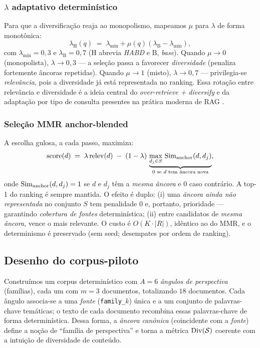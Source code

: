 \subsubsection{$\lambda$ adaptativo determinístico}

Para que a diversificação reaja ao monopolismo, mapeamos $\mu$ para $\lambda$ de
forma monotônica:
\[
\label{eq:lambda}
\lambda_{\mathrm H}(q) \;=\; \lambda_{\min} + \mu(q)
\left(\lambda_{\mathrm B} - \lambda_{\min}\right),
\]
com $\lambda_{\min}=0{,}3$ e $\lambda_{\mathrm B}=0{,}7$
($\mathrm H$ abrevia \emph{HABD} e $\mathrm B$, \emph{base}).
Quando $\mu\to 0$
(monopolista), $\lambda\to 0{,}3$ — a seleção passa a favorecer \emph{diversidade}
(penaliza fortemente âncoras repetidas). Quando $\mu\to 1$ (misto), $\lambda\to
0{,}7$ — privilegia-se \emph{relevância}, pois a diversidade já está
representada no ranking. Essa rotação entre relevância e diversidade é a ideia
central do \emph{over-retrieve + diversify} e da adaptação por tipo de consulta
presentes na prática moderna de RAG \citep{Khan2026DFRAG,RezaeiDieng2025VendiRAG}.

\subsubsection{Seleção MMR anchor-blended}

A escolha gulosa, a cada passo, maximiza:
\[
\label{eq:habdscore}
\mathrm{score}(d) \;=\; \lambda\,\mathrm{relev}(d) \;-\; (1-\lambda)\,
\underbrace{\max_{d_j\in S}\, \Sim_{\mathrm{anchor}}(d,d_j)}_{\mathclap{\text{0 se }d\text{ tem âncora nova}}} ,
\]
onde $\mathrm{Sim}_{\mathrm{anchor}}(d,d_j)=1$ se $d$ e $d_j$ têm a \emph{mesma âncora} e
$0$ caso contrário. A top-1 do ranking é sempre mantida. O efeito é duplo: (i)
uma \emph{âncora ainda não representada} no conjunto $S$ tem penalidade $0$ e,
portanto, prioridade — garantindo \emph{cobertura de fontes} determinística; (ii)
entre candidatos de \emph{mesma âncora}, vence o mais relevante. O custo é
$O(K\cdot |R|)$, idêntico ao do MMR, e o determinismo é preservado (sem seed;
desempates por ordem de ranking).

\subsection{Desenho do corpus-piloto}

Construímos um corpus determinístico com $A=6$ \emph{ângulos de perspectiva}
(famílias), cada um com $m=3$ documentos, totalizando $18$ documentos. Cada
ângulo associa-se a uma \emph{fonte} (\texttt{family\_$k$}) única e a um conjunto
de palavras-chave temáticas; o texto de cada documento recombina essas
palavras-chave de forma determinística. Dessa forma, a \emph{âncora canônica}
(coincidente com a \emph{fonte}) define a noção de ``família de perspectiva'' e
torna a métrica $\mathrm{Div}(\mathcal{S})$ coerente com a intuição de diversidade de
conteúdo.

